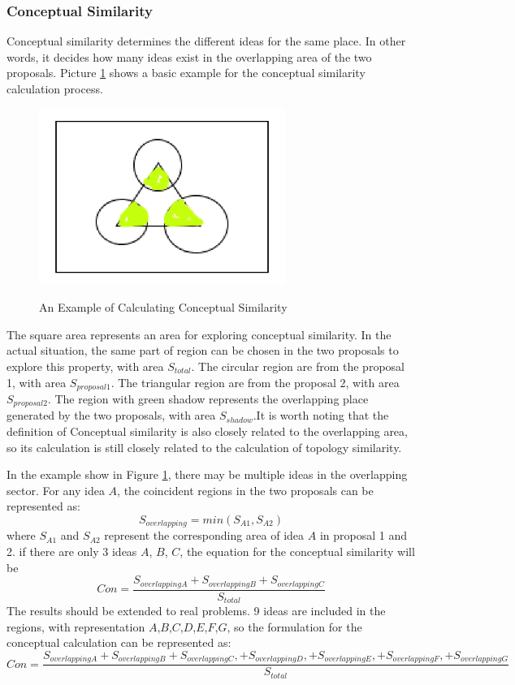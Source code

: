 \subsubsection*{Conceptual Similarity}
Conceptual similarity determines the different ideas for the same place. In other words, it decides how many ideas exist in the overlapping area of the two proposals. Picture \ref{7777} shows a basic example for the conceptual similarity calculation process.
\begin{figure}[H]
\caption{An Example of Calculating Conceptual Similarity}
\centering
\includegraphics[scale=0.7]{777777.png}
\label{7777}
\end{figure}
The square area represents an area for exploring conceptual similarity. In the actual situation, the same part of region can be chosen in the two proposals to explore this property, with area $S_{total}$. The circular region are from the proposal 1, with area $S_{proposal1}$. The triangular region are from the proposal 2, with area $S_{proposal2}$. The region with green shadow represents the overlapping place generated by the two proposals, with area $S_{shadow}$.It is worth noting that the definition of Conceptual similarity is also closely related to the overlapping area, so its calculation is still closely related to the calculation of topology similarity.

In the example show in Figure \ref{7777}, there may be multiple ideas in the overlapping sector. For any idea $A$, the coincident regions in the two proposals can be represented as:
$$
S_{overlapping} = min(S_{A1},S_{A2}) 
$$
where $S_{A1}$ and $S_{A2}$ represent the corresponding area of idea $A$ in proposal 1 and 2. if there are only 3 ideas $A$, $B$, $C$, the equation for the conceptual similarity will be
\begin{equation}
    Con = \frac{S_{overlappingA}+S_{overlappingB}+S_{overlappingC}}{S_{total}}
\end{equation}
The results should be extended to real problems. 9 ideas are included in the regions, with representation $A$,$B$,$C$,$D$,$E$,$F$,$G$, so the formulation for the conceptual calculation can be represented as:
\begin{equation}
    Con = \frac{S_{overlappingA}+S_{overlappingB}+S_{overlappingC},+S_{overlappingD},+S_{overlappingE},+S_{overlappingF},+S_{overlappingG}}{S_{total}}
\end{equation}


